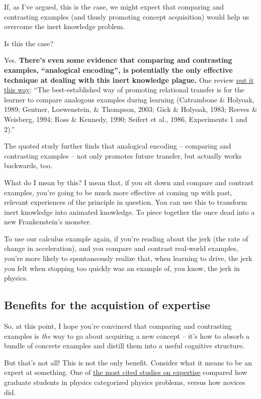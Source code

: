 If, as I've argued, this is the case, we might expect that comparing and
contrasting examples (and thusly promoting concept acquisition) would
help us overcome the inert knowledge problem.

Is this the case?

Yes. \textbf{There's even some evidence that comparing and contrasting
examples, ``analogical encoding'', is potentially the only effective
technique at dealing with this inert knowledge plague.} One review
\href{http://onlinelibrary.wiley.com/doi/10.1111/j.1551-6709.2009.01070.x/full}{put
it this way}: ``The best-established way of promoting relational
transfer is for the learner to compare analogous examples during
learning (Catrambone \& Holyoak, 1989; Gentner, Loewenstein, \&
Thompson, 2003; Gick \& Holyoak, 1983; Reeves \& Weisberg, 1994; Ross \&
Kennedy, 1990; Seifert et al., 1986, Experiments 1 and 2).''

The quoted study further finds that analogical encoding -- comparing and
contrasting examples -- not only promotes future transfer, but actually
works backwards, too.

What do I mean by this? I mean that, if you sit down and compare and
contrast examples, you're going to be much more effective at coming up
with past, relevant experiences of the principle in question. You can
use this to transform inert knowledge into animated knowledge. To piece
together the once dead into a new Frankenstein's monster.

To use our calculus example again, if you're reading about the jerk (the
rate of change in acceleration), and you compare and contrast real-world
examples, you're more likely to spontaneously realize that, when
learning to drive, the jerk you felt when stopping too quickly was an
example of, you know, the jerk in physics.

\subsection{Benefits for the acquistion of
expertise}\label{benefits-for-the-acquistion-of-expertise}

So, at this point, I hope you're convinced that comparing and
contrasting examples is \emph{the} way to go about acquiring a new
concept -- it's how to absorb a bundle of concrete examples and distill
them into a useful cognitive structure.

But that's not all! This is not the only benefit. Consider what it means
to be an expert at something. One of
\href{http://eric.ed.gov/?id=ED215899}{the most cited studies on
expertise} compared how graduate students in physics categorized physics
problems, versus how novices did.

